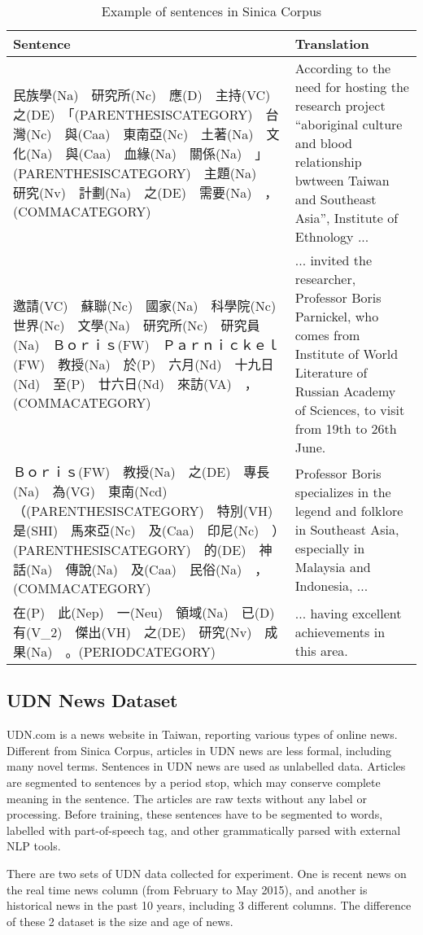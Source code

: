 \begin{table}[t]
\begin{center}
\begin{tabular}{| m{10cm} | m{6cm} |}
\hline
Sentence   &   Translation\\
\hline
{\small 民族學(Na)　研究所(Nc)　應(D)　主持(VC)　之(DE)　「(PARENTHESISCATEGORY)　台灣(Nc)　與(Caa)　東南亞(Nc)　土著(Na)　文化(Na)　與(Caa)　血緣(Na)　關係(Na)　」(PARENTHESISCATEGORY)　主題(Na)　研究(Nv)　計劃(Na)　之(DE)　需要(Na)　，(COMMACATEGORY)}  &   {According to the need for hosting the research project ``aboriginal culture and blood relationship bwtween Taiwan and Southeast Asia'', Institute of Ethnology ...}\\
\hline
{\small 邀請(VC)　蘇聯(Nc)　國家(Na)　科學院(Nc)　世界(Nc)　文學(Na)　研究所(Nc)　研究員(Na)　Ｂｏｒｉｓ(FW)　Ｐａｒｎｉｃｋｅｌ(FW)　教授(Na)　於(P)　六月(Nd)　十九日(Nd)　至(P)　廿六日(Nd)　來訪(VA)　，(COMMACATEGORY)}  &   {... invited the researcher, Professor Boris Parnickel, who comes from Institute of World Literature of Russian Academy of Sciences, to visit from 19th to 26th June.}\\
\hline
{\small Ｂｏｒｉｓ(FW)　教授(Na)　之(DE)　專長(Na)　為(VG)　東南(Ncd)　（(PARENTHESISCATEGORY)　特別(VH)　是(SHI)　馬來亞(Nc)　及(Caa)　印尼(Nc)　）(PARENTHESISCATEGORY)　的(DE)　神話(Na)　傳說(Na)　及(Caa)　民俗(Na)　，(COMMACATEGORY)}   &   {Professor Boris specializes in the legend and folklore in Southeast Asia, especially in Malaysia and Indonesia, ...}\\
\hline
{\small 在(P)　此(Nep)　一(Neu)　領域(Na)　已(D)　有(V\_2)　傑出(VH)　之(DE)　研究(Nv)　成果(Na)　。(PERIODCATEGORY)}   &   {... having excellent achievements in this area.}\\
\hline
\end{tabular}
\caption[Example of sentences in Sinica Corpus]{Example of sentences in Sinica Corpus}
\label{tab:sa_example}
\end{center}
\end{table}

\subsection{UDN News Dataset}
\par
UDN.com is a news website in Taiwan, reporting various types of online news.
Different from Sinica Corpus, articles in UDN news are less formal, including many novel terms.
Sentences in UDN news are used as unlabelled data.
Articles are segmented to sentences by a period stop, which may conserve complete meaning in the sentence.
The articles are raw texts without any label or processing.
Before training, these sentences have to be segmented to words, labelled with part-of-speech tag, and other grammatically parsed with external NLP tools.
\par
There are two sets of UDN data collected for experiment.
One is recent news on the real time news column (from February to May 2015), and another is historical news in the past 10 years, including 3 different columns.
The difference of these 2 dataset is the size and age of news.

